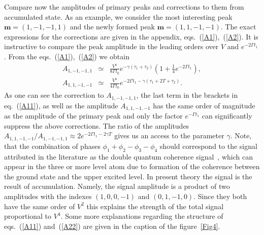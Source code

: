 \documentclass[prb,twocolumn,showpacs,epsfig,epsf]{revtex4}
\newcommand{\1}{\mathds{1}}
\begin{document}
 
Compare now the amplitudes of primary peaks and corrections to them from accumulated state. As an example, we consider the most interesting peak ${\boldsymbol m}=(1,-1,-1,1)$ and the newly formed peak ${\boldsymbol m}=(1,1,-1,-1)$.  The exact expressions for the corrections are given in the appendix, eqs.~(\ref{A1}),~(\ref{A2}). It is instructive to compare the peak amplitude in the leading orders over $V$ and $e^{-2\Gamma t_1}$. From the eqs.~(\ref{A1}),~(\ref{A2}) we obtain
{\small \begin{eqnarray}
A_{1,-1,-1,1}&\simeq &\frac{V^4}{8\Gamma t_0}e^{-\gamma(\tau_1+\tau_2)}\left(1+\frac{1}{4}e^{-2\Gamma t_1}\right),\label{A11}\\
A_{1,1,-1,-1}&\simeq &\frac{V^4}{4\Gamma t_0}e^{-2\Gamma t_1-\gamma(\tau_1+2T+\tau_2)}.\label{A22}
\end{eqnarray}}
As one can see the correction to $A_{1,-1,-1,1}$, the last term in the brackets in eq.~(\ref{A11}), as well as the amplitude $A_{1,1,-1,-1}$ has the same order of magnitude as the amplitude of the primary peak and only the factor $e^{-\Gamma t_1}$ can significantly suppress the above corrections. The ratio of the amplitudes $A_{1,1,-1,-1}/A_{1,-1,-1,1}\approx 2 e^{-2\Gamma t_1-2\gamma T}$ gives us an access to the parameter $\gamma$. Note, that the combination of phases $\phi_1+\phi_2-\phi_3-\phi_4$ should correspond to the signal attributed in the literature as the double quantum coherence signal~\cite{MOY2007}, which can appear in the three or more level atom due to formation of the coherence between the ground state and the upper excited level. In present theory the signal is the result of accumulation. Namely, the signal amplitude is a product of two amplitudes with the indexes $(1,0,0,-1)$ and $(0,1,-1,0)$. Since they both have the same order of $V^2$ this explains the strength of the total signal proportional to $V^4$. Some more explanations regarding the structure of  eqs.~(\ref{A11}) and~(\ref{A22}) are given in the caption of the figure~\ref{Fig4}.
\end{document}
